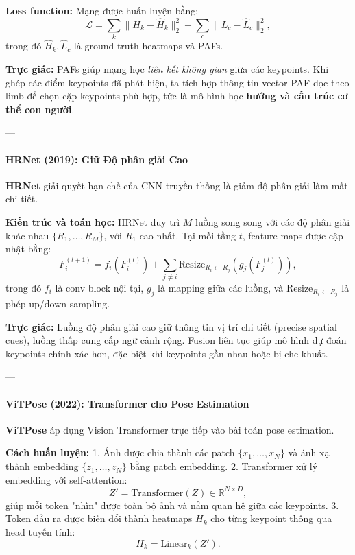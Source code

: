 \textbf{Loss function:} Mạng được huấn luyện bằng:
\begin{equation}
	\mathcal{L} = \sum_{k} \| H_k - \hat{H}_k \|_2^2 + \sum_{c} \| L_c - \hat{L}_c \|_2^2,
\end{equation}
trong đó $\hat{H}_k, \hat{L}_c$ là ground-truth heatmaps và PAFs.  

\textbf{Trực giác:} PAFs giúp mạng học \textit{liên kết không gian} giữa các keypoints. Khi ghép các điểm keypoints đã phát hiện, ta tích hợp thông tin vector PAF dọc theo limb để chọn cặp keypoints phù hợp, tức là mô hình học \textbf{hướng và cấu trúc cơ thể con người}.

---

\paragraph{HRNet (2019): Giữ Độ phân giải Cao}
\textbf{HRNet} \cite{Sun2019} giải quyết hạn chế của CNN truyền thống là giảm độ phân giải làm mất chi tiết. 

\textbf{Kiến trúc và toán học:}  
HRNet duy trì $M$ luồng song song với các độ phân giải khác nhau $\{R_1, \dots, R_M\}$, với $R_1$ cao nhất. Tại mỗi tầng $t$, feature maps được cập nhật bằng:
\begin{equation}
	F_i^{(t+1)} = f_i(F_i^{(t)}) + \sum_{j \neq i} \text{Resize}_{R_i \leftarrow R_j}(g_j(F_j^{(t)})),
\end{equation}
trong đó $f_i$ là conv block nội tại, $g_j$ là mapping giữa các luồng, và $\text{Resize}_{R_i \leftarrow R_j}$ là phép up/down-sampling.  

\textbf{Trực giác:} Luồng độ phân giải cao giữ thông tin vị trí chi tiết (precise spatial cues), luồng thấp cung cấp ngữ cảnh rộng. Fusion liên tục giúp mô hình dự đoán keypoints chính xác hơn, đặc biệt khi keypoints gần nhau hoặc bị che khuất.

---

\paragraph{ViTPose (2022): Transformer cho Pose Estimation}
\textbf{ViTPose} \cite{Xu2022} áp dụng Vision Transformer trực tiếp vào bài toán pose estimation.

\textbf{Cách huấn luyện:}  
1. Ảnh được chia thành các patch $\{x_1, \dots, x_N\}$ và ánh xạ thành embedding $\{z_1, \dots, z_N\}$ bằng patch embedding.
2. Transformer xử lý embedding với self-attention:
\begin{equation}
	Z' = \text{Transformer}(Z) \in \mathbb{R}^{N \times D},
\end{equation}
giúp mỗi token "nhìn" được toàn bộ ảnh và nắm quan hệ giữa các keypoints.
3. Token đầu ra được biến đổi thành heatmaps $H_k$ cho từng keypoint thông qua head tuyến tính:
\begin{equation}
	H_k = \text{Linear}_k(Z').
\end{equation}

